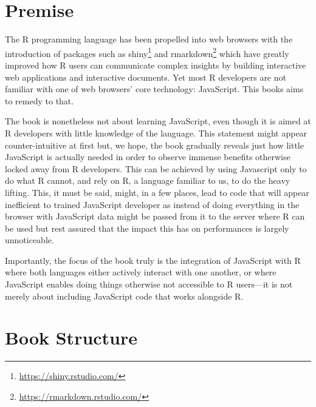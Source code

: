 \documentclass[
]{krantz}
\renewcommand{\href}[2]{#2\footnote{\url{#1}}}
\begin{document}
\hypertarget{premise}{%
\section*{Premise}\label{premise}}


The R programming language has been propelled into web browsers with the introduction of packages such as \href{https://shiny.rstudio.com/}{shiny} \citep{R-shiny} and \href{https://rmarkdown.rstudio.com/}{rmarkdown} \citep{R-rmarkdown} which have greatly improved how R users can communicate complex insights by building interactive web applications and interactive documents. Yet most R developers are not familiar with one of web browsers' core technology: JavaScript. This books aims to remedy to that.

The book is nonetheless not about learning JavaScript, even though it is aimed at R developers with little knowledge of the language. This statement might appear counter-intuitive at first but, we hope, the book gradually reveals just how little JavaScript is actually needed in order to observe immense benefits otherwise locked away from R developers. This can be achieved by using Javascript only to do what R cannot, and rely on R, a language familiar to us, to do the heavy lifting. This, it must be said, might, in a few places, lead to code that will appear inefficient to trained JavaScript developer as instead of doing everything in the browser with JavaScript data might be passed from it to the server where R can be used but rest assured that the impact this has on performances is largely unnoticeable.

Importantly, the focus of the book truly is the integration of JavaScript with R where both languages either actively interact with one another, or where JavaScript enables doing things otherwise not accessible to R users---it is not merely about including JavaScript code that works alongside R.

\hypertarget{book-structure}{%
\section*{Book Structure}\label{book-structure}}
\end{document}
